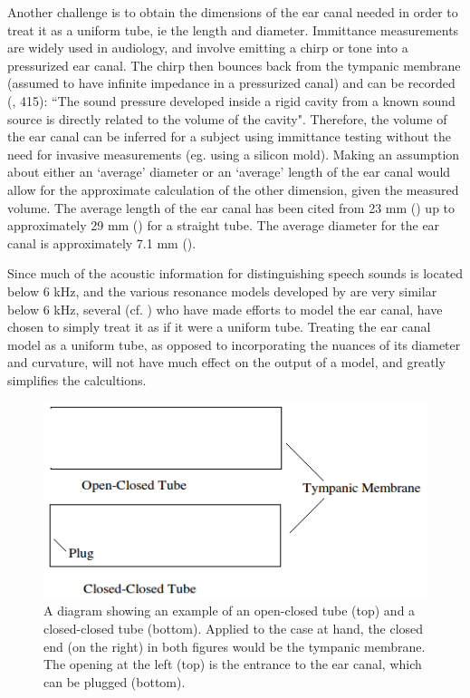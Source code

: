 Another challenge is to obtain the dimensions of the ear canal needed in order to treat it as a uniform tube, ie the length and diameter. Immittance measurements are widely used in audiology, and involve emitting a chirp or tone into a pressurized ear canal.  The chirp then bounces back from the tympanic membrane (assumed to have infinite impedance in a pressurized canal) and can be recorded (\cite{ballachanda:97}, 415): ``The sound pressure developed inside a rigid cavity from a known sound source is directly related to the volume of the cavity".  Therefore, the volume of the ear canal can be inferred for a subject using immittance testing without the need for invasive measurements (eg. using a silicon mold).  Making an assumption about either an `average' diameter or an `average' length of the ear canal would allow for the approximate calculation of the other dimension, given the measured volume. The average length of the ear canal has been cited from 23 mm (\cite{rosen:91}) up to approximately 29 mm (\cite{stinson:89}) for a straight tube. The average diameter for the ear canal is approximately 7.1 mm (\cite{salvinelli:91}).

Since much of the acoustic information for distinguishing speech sounds is located below 6 kHz, and the various resonance models developed by \cite{stinson:89} are very similar below 6 kHz, several (cf. \cite{stinson:89,hansen:97b,stenfelt:07}) who have made efforts to model the ear canal, have chosen to simply treat it as if it were a uniform tube.  Treating the ear canal model as a uniform tube, as opposed to incorporating the nuances of its diameter and curvature, will not have much effect on the output of a model, and greatly simplifies the calcultions.

\begin{figure}[h!]
\centering
  \includegraphics{figure/open-closed-tube.png}
  \caption{A diagram showing an example of an open-closed tube (top) and a closed-closed tube (bottom).  Applied to the case at hand, the closed end (on the right) in both figures would be the tympanic membrane.  The opening at the left (top) is the entrance to the ear canal, which can be plugged (bottom).}
  \label{fig:open-closed-tube}
\end{figure}

